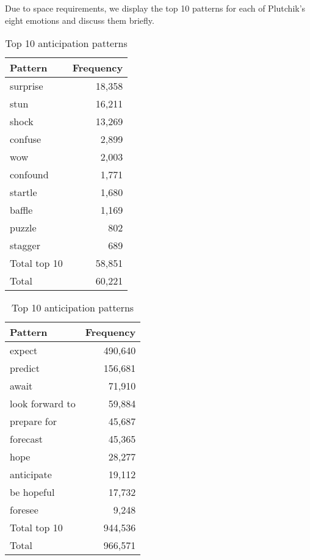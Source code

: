 Due to space requirements, we display the top 10 patterns for each of Plutchik's eight emotions and discuss them briefly.

\begin{table}[!htb]
    \begin{minipage}{.45\linewidth}
		\centering
		\begin{tabular}{l|r}
			{\bf Pattern} & {\bf Frequency} \\\hline
			surprise      & 18,358          \\
			stun          & 16,211          \\
			shock         & 13,269          \\
			confuse       & 2,899           \\
			wow           & 2,003           \\
			confound      & 1,771           \\
			startle       & 1,680           \\
			baffle        & 1,169           \\
			puzzle        & 802             \\
			stagger       & 689             \\\hline
			Total top 10  & 58,851          \\
			Total         & 60,221         
		\end{tabular}
		\caption{Top 10 surprise patterns}
		\label{tab:surprise-patterns}
	\end{minipage}
	\begin{minipage}{.45\linewidth}
		\centering
		\begin{tabular}{l|r}
			{\bf Pattern}   & {\bf Frequency} \\\hline
			expect          & 490,640         \\
			predict         & 156,681         \\
			await           & 71,910          \\
			look forward to & 59,884          \\
			prepare for     & 45,687          \\
			forecast        & 45,365          \\
			hope            & 28,277          \\
			anticipate      & 19,112          \\
			be hopeful      & 17,732          \\
			foresee         & 9,248           \\\hline
			Total top 10    & 944,536         \\
			Total           & 966,571        
		\end{tabular}
		\caption{Top 10 anticipation patterns}
		\label{tab:anticipation-patterns}
	\end{minipage}
\end{table}

